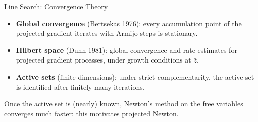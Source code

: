 \documentclass[main.tex]{subfiles}
\begin{document}
\begin{frame}{Line Search: Convergence Theory}
  \begin{hlbox}
    \begin{itemize}
      \item \textbf{Global convergence} (Bertsekas 1976): every accumulation point of the projected gradient iterates with Armijo steps is stationary.
      \item \textbf{Hilbert space} (Dunn 1981): global convergence and rate estimates for projected gradient processes, under growth conditions at $\bar z$.
      \item \textbf{Active sets} (finite dimensions): under strict complementarity, the active set is identified after finitely many iterations.
    \end{itemize}
  \end{hlbox}

  \begin{qbox}
    Once the active set is (nearly) known, Newton's method on the free variables converges much faster: this motivates projected Newton.
  \end{qbox}
  \vfill\hfill\hyperlink{armijo<3>}{}
\end{frame}
\end{document}

